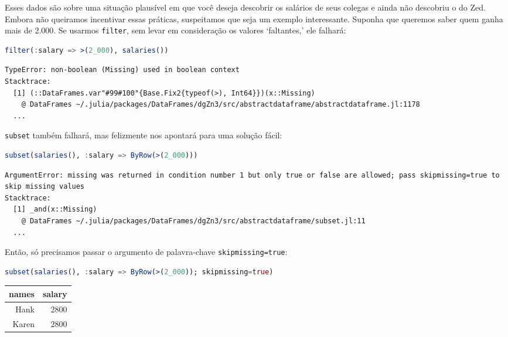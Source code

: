 \documentclass[
  notoc %
]{tufte-book}
\newcommand{\passthrough}[1]{#1}
\begin{document}
Esses dados são sobre uma situação plausível em que você deseja
descobrir os salários de seus colegas e ainda não descobriu o do Zed.
Embora não queiramos incentivar essas práticas, suspeitamos que seja um
exemplo interessante. Suponha que queremos saber quem ganha mais de
2.000. Se usarmos \passthrough{\lstinline!filter!}, sem levar em
consideração os valores `faltantes,' ele falhará:

\begin{lstlisting}[language=Julia]
filter(:salary => >(2_000), salaries())
\end{lstlisting}

\begin{lstlisting}[language=Output]
TypeError: non-boolean (Missing) used in boolean context
Stacktrace:
  [1] (::DataFrames.var"#99#100"{Base.Fix2{typeof(>), Int64}})(x::Missing)
    @ DataFrames ~/.julia/packages/DataFrames/dgZn3/src/abstractdataframe/abstractdataframe.jl:1178
  ...
\end{lstlisting}

\passthrough{\lstinline!subset!} também falhará, mas felizmente nos
apontará para uma solução fácil:

\begin{lstlisting}[language=Julia]
subset(salaries(), :salary => ByRow(>(2_000)))
\end{lstlisting}

\begin{lstlisting}[language=Output]
ArgumentError: missing was returned in condition number 1 but only true or false are allowed; pass skipmissing=true to skip missing values
Stacktrace:
  [1] _and(x::Missing)
    @ DataFrames ~/.julia/packages/DataFrames/dgZn3/src/abstractdataframe/subset.jl:11
  ...
\end{lstlisting}

Então, só precisamos passar o argumento de palavra-chave
\passthrough{\lstinline!skipmissing=true!}:

\begin{lstlisting}[language=Julia]
subset(salaries(), :salary => ByRow(>(2_000)); skipmissing=true)
\end{lstlisting}

\begin{longtable}[]{@{}rr@{}}
\toprule
names & salary \\
\midrule
\endhead
Hank & 2800 \\
Karen & 2800 \\
\bottomrule
\end{longtable}
\end{document}
